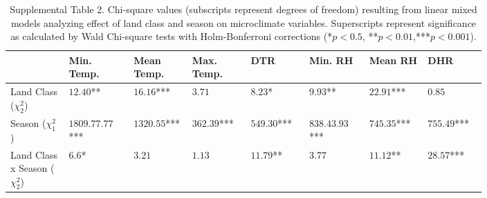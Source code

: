\documentclass[12pt]{article}
\begin{document}
\begin{table}
\centering
\begin{tabular}{P{0.10\linewidth}P{0.10\linewidth}P{0.10\linewidth}P{0.10\linewidth}P{0.10\linewidth}P{0.10\linewidth}P{0.10\linewidth}P{0.10\linewidth}}
\hline
\textbf{ } & \textbf{Min. Temp.} & \textbf{Mean Temp.} & \textbf{Max. Temp.}  & \textbf{DTR} & \textbf{Min. RH} & \textbf{Mean RH} & \textbf{DHR} \\
\hline

Land Class ($\chi^2_2$) 		& $12.40$**  		& $16.16$***  	& $3.71$		& $8.23$*		& $9.93$**		& $22.91$***	& $0.85$\\
Season 	($\chi^2_1$)			& $1809.77.77$*** 	& $1320.55$*** 	& $362.39$*** 	& $549.30$*** 	& $838.43.93$***& $745.35$***	& $755.49$***\\
Land Class x Season ($\chi^2_2$)& $6.6$* 			& $3.21$  		& $1.13$		& $11.79$**		& $3.77$		& $11.12$**		& $28.57$***\\
\hline
\end{tabular}
\caption{Supplemental Table 2. Chi-square values (subscripts represent degrees of freedom) resulting from linear mixed models analyzing effect of land class and season on microclimate variables. Superscripts represent significance as calculated by Wald Chi-square tests with Holm-Bonferroni corrections (*$p<0.5$, **$p<0.01$,***$p<0.001$).}
\end{table}
\end{document}
